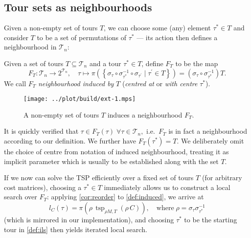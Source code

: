 \documentclass[titlepage,twoside,index=totoc,bibliography=totoc]{scrartcl}
\numberwithin{equation}{section}
\numberwithin{figure}{section}
\numberwithin{table}{section}
\let\defstyle\itshape
\begin{document}
\subsection{Tour sets as neighbourhoods}

Given a non-empty set of tours $T$, we can choose some (any) element
$\tau^\ast \in T$ and consider $T$ to be a set of permutations of
$\tau^\ast$ --- its action then defines a neighbourhood in $\mathcal{T}_n$:

\begin{define}
  \label{def:induced}
  Given a set of tours $T \subseteq \mathcal{T}_n$ and a tour $\tau^\ast \in T$,
  define $F_T$ to be the map
  \[
    F_T: \mathcal{T}_n \to 2^{\mathcal{T}_n}, \quad
    \tau \mapsto
    \pi \left(
      \left\{ \sigma_{\tau} \circ \sigma_{\tau^\ast}^{-1} \circ \sigma_{\tau^\prime}
              \mid \tau^{\prime} \in T\right\}
    \right)
    =
      \left(\sigma_{\tau} \circ \sigma_{\tau^\ast}^{-1}\right) T.
  \]
  We call $F_T$ {\defstyle neighbourhood induced by} $T$
  ({\defstyle centred at} or {\defstyle with centre} $\tau^\ast$).
\end{define}

\begin{figure}[bht]
  \centering
  \texttt{[image: ../plot/build/ext-1.mps]}
  \caption{A non-empty set of tours $T$ induces a neighbourhood $F_T$.}
\end{figure}

\begin{remark}
  It is quickly verified that
  $\tau \in F_T\left(\tau\right) \; \forall \tau \in \mathcal{T}_n,$
  i.e.\ $F_T$ is in fact a neighbourhood according to our definition.
  We further have $F_T\left(\tau^\ast\right) = T$.
  We deliberately omit the choice of centre from notation of induced
  neighbourhood, treating it as implicit parameter which is usually
  to be established along with the set $T$.
\end{remark}

If we now can solve the TSP efficiently over a fixed set of tours $T$
(for arbitrary cost matrices), choosing a $\tau^\ast \in T$ immediately
allows us to construct a local search over $F_T$:
applying \cref{cor:reorder} to \cref{def:induced}, we arrive at
\[
  l_C\left(\tau\right) =
  \pi\left(\rho\,\operatorname{tsp}_{\rho M,T}\left(\rho\, C\right)\right),
  \quad
  \text{where}\; \rho = \sigma_\tau \sigma_{\tau^\ast}^{-1}
\]
(which is mirrored in our implementation),
and choosing $\tau^\ast$ to be the starting tour in \cref{def:ils} then
yields iterated local search.
%
%
%
\end{document}
